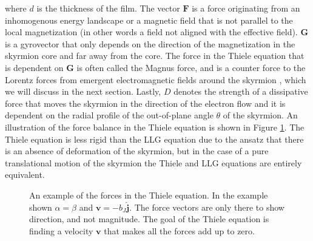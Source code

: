 where $d$ is the thickness of the film. The vector $\mathbold{F}$ is a force originating from an inhomogenous energy landscape or a magnetic field that is not parallel to the local magnetization (in other words a field not aligned with the effective field). $\mathbold{G}$ is a gyrovector that only depends on the direction of the magnetization in the skyrmion core and far away from the core. The force in the Thiele equation that is dependent on $\mathbold{G}$ is often called the Magnus force, and is a counter force to the Lorentz forces from emergent electromagnetic fields around the skyrmion \cite{Everschor-Sitte2014}, which we will discuss in the next section. Lastly, $D$ denotes the strength of a dissipative force that moves the skyrmion in the direction of the electron flow and it is dependent on the radial profile of the out-of-plane angle $\theta$ of the skyrmion. An illustration of the force balance in the Thiele equation is shown in Figure \ref{fig:Thiele}. The Thiele equation is less rigid than the LLG equation due to the ansatz that there is an absence of deformation of the skyrmion, but in the case of a pure translational motion of the skyrmion the Thiele and LLG equations are entirely equivalent.
\begin{figure}[h!]
\centering
  \centering
\caption{An example of the forces in the Thiele equation. In the example shown $\alpha=\beta$ and $\mathbold{v}=-b_J\mathbold{\hat{j}}$. The force vectors are only there to show direction, and not magnitude. The goal of the Thiele equation is finding a velocity $\mathbold{v}$ that makes all the forces add up to zero.}
\label{fig:Thiele}
\end{figure}

